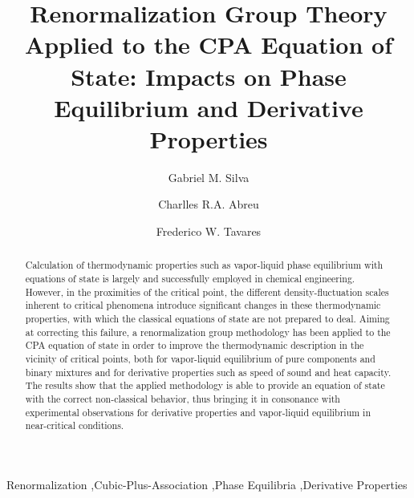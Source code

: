 \documentclass[preprint,12pt,3p]{elsarticle}
\date{\vspace{-5ex}}
\begin{document}
\begin{frontmatter}

\title{Renormalization Group Theory Applied to the CPA Equation of State: Impacts on Phase Equilibrium and Derivative Properties}


\author[1]{Gabriel M. Silva}
\author[1]{Charlles R.A. Abreu}
\author[1,2]{Frederico W. Tavares}
\address[1]{Escola de Química, Universidade Federal do Rio de Janeiro, Rio de Janeiro C.P. 68542, Brazil}
\address[2]{Programa de Engenharia Química – COPPE, Universidade Federal do Rio de Janeiro, Rio de Janeiro, C.P. 68542, Brazil}

\begin{abstract}
Calculation of thermodynamic properties such as vapor-liquid phase equilibrium with equations of state is largely and successfully employed in chemical engineering. However, in the proximities of the critical point, the different density-fluctuation scales inherent to critical phenomena introduce significant changes in these thermodynamic properties, with which the classical equations of state are not prepared to deal. Aiming at correcting this failure, a renormalization group methodology has been applied to the CPA equation of state in order to improve the thermodynamic description in the vicinity of critical points, both for vapor-liquid equilibrium of pure components and binary mixtures and for derivative properties such as speed of sound and heat capacity. The results show that the applied methodology is able to provide an equation of state with the correct non-classical behavior, thus bringing it in consonance with experimental observations for derivative properties and vapor-liquid equilibrium in near-critical conditions.
\end{abstract}

\begin{keyword}
Renormalization \sep Cubic-Plus-Association \sep Phase Equilibria \sep Derivative Properties
\end{keyword}

\end{frontmatter}

\linenumbers

\renewcommand{\thesection}{\arabic{section}}
\end{document}
